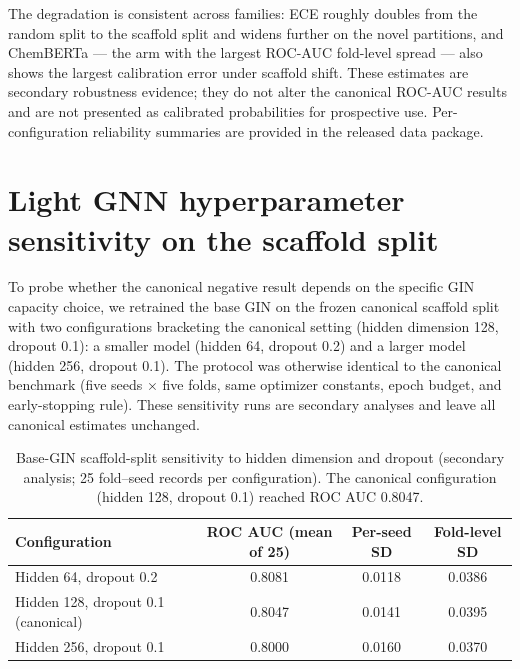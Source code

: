 \documentclass[11pt,a4paper]{article}
\begin{document}
The degradation is consistent across families: ECE roughly doubles from the random split to the scaffold split and widens further on the novel partitions, and ChemBERTa --- the arm with the largest ROC-AUC fold-level spread --- also shows the largest calibration error under scaffold shift. These estimates are secondary robustness evidence; they do not alter the canonical ROC-AUC results and are not presented as calibrated probabilities for prospective use. Per-configuration reliability summaries are provided in the released data package.

\section{Light GNN hyperparameter sensitivity on the scaffold split}
\label{sec:gnn_sensitivity_si}

To probe whether the canonical negative result depends on the specific GIN capacity choice, we retrained the base GIN on the frozen canonical scaffold split with two configurations bracketing the canonical setting (hidden dimension \num{128}, dropout \num{0.1}): a smaller model (hidden \num{64}, dropout \num{0.2}) and a larger model (hidden \num{256}, dropout \num{0.1}). The protocol was otherwise identical to the canonical benchmark (five seeds $\times$ five folds, same optimizer constants, epoch budget, and early-stopping rule). These sensitivity runs are secondary analyses and leave all canonical estimates unchanged.

\begin{table}[h]
\centering
\caption{Base-GIN scaffold-split sensitivity to hidden dimension and dropout (secondary analysis; \num{25} fold--seed records per configuration). The canonical configuration (hidden \num{128}, dropout \num{0.1}) reached ROC AUC \num{0.8047}.}
\label{tab:s3_gin_sensitivity}
\begin{tabular}{lccc}
\toprule
Configuration & ROC AUC (mean of \num{25}) & Per-seed SD & Fold-level SD \\
\midrule
Hidden \num{64}, dropout \num{0.2} & \num{0.8081} & \num{0.0118} & \num{0.0386} \\
Hidden \num{128}, dropout \num{0.1} (canonical) & \num{0.8047} & \num{0.0141} & \num{0.0395} \\
Hidden \num{256}, dropout \num{0.1} & \num{0.8000} & \num{0.0160} & \num{0.0370} \\
\bottomrule
\end{tabular}
\end{table}
\end{document}
